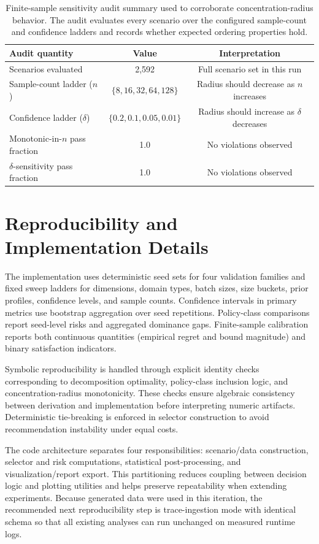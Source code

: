 \documentclass{article} %
\begin{document}
\begin{table}[t]
\caption{Finite-sample sensitivity audit summary used to corroborate concentration-radius behavior. The audit evaluates every scenario over the configured sample-count and confidence ladders and records whether expected ordering properties hold.}
\label{tab:bound_sensitivity}
\centering
\small
\renewcommand{\arraystretch}{1.1}
\setlength{\tabcolsep}{5pt}
\begin{tabular}{lcc}
\hline
Audit quantity & Value & Interpretation \\
\hline
Scenarios evaluated & 2{,}592 & Full scenario set in this run \\
Sample-count ladder ($n$) & $\{8,16,32,64,128\}$ & Radius should decrease as $n$ increases \\
Confidence ladder ($\delta$) & $\{0.2,0.1,0.05,0.01\}$ & Radius should increase as $\delta$ decreases \\
Monotonic-in-$n$ pass fraction & 1.0 & No violations observed \\
$\delta$-sensitivity pass fraction & 1.0 & No violations observed \\
\hline
\end{tabular}
\end{table}

\section{Reproducibility and Implementation Details}
The implementation uses deterministic seed sets for four validation families and fixed sweep ladders for dimensions, domain types, batch sizes, size buckets, prior profiles, confidence levels, and sample counts. Confidence intervals in primary metrics use bootstrap aggregation over seed repetitions. Policy-class comparisons report seed-level risks and aggregated dominance gaps. Finite-sample calibration reports both continuous quantities (empirical regret and bound magnitude) and binary satisfaction indicators.

Symbolic reproducibility is handled through explicit identity checks corresponding to decomposition optimality, policy-class inclusion logic, and concentration-radius monotonicity. These checks ensure algebraic consistency between derivation and implementation before interpreting numeric artifacts. Deterministic tie-breaking is enforced in selector construction to avoid recommendation instability under equal costs.

The code architecture separates four responsibilities: scenario/data construction, selector and risk computations, statistical post-processing, and visualization/report export. This partitioning reduces coupling between decision logic and plotting utilities and helps preserve repeatability when extending experiments. Because generated data were used in this iteration, the recommended next reproducibility step is trace-ingestion mode with identical schema so that all existing analyses can run unchanged on measured runtime logs.
\end{document}
